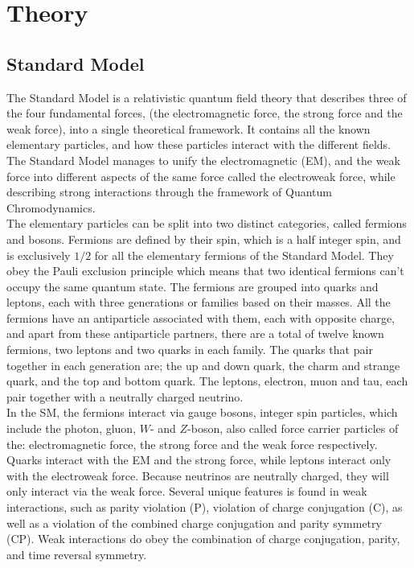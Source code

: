 \documentclass[12pt,a4paper]{article}
\numberwithin{equation}{section}
\begin{document}
\section{Theory}

\subsection{Standard Model}
The Standard Model is a relativistic quantum field theory that describes three
of the four fundamental forces, (the electromagnetic force, the strong force and
the weak force), into a single theoretical framework. It contains all the known
elementary particles, and how these particles interact with the different
fields. The Standard Model manages to unify the electromagnetic (EM), and the
weak force into different aspects of the same force called the electroweak
force, while describing strong interactions through the framework of Quantum
Chromodynamics.\\

The elementary particles can be split into two distinct categories, called
fermions and bosons. Fermions are defined by their spin, which is a half integer
spin, and is exclusively $1/2$ for all the elementary fermions of the Standard
Model. They obey the Pauli exclusion principle which means that two identical
fermions can't occupy the same quantum state. The fermions are grouped into
quarks and leptons, each with three generations or families based on their
masses. All the fermions have an antiparticle associated with them, each with
opposite charge, and apart from these antiparticle partners, there are a total
of twelve known fermions, two leptons and two quarks in each family. The quarks
that pair together in each generation are; the up and down quark, the charm and
strange quark, and the top and bottom quark. The leptons, electron, muon and
tau, each pair together with a neutrally charged neutrino.\\


In the SM, the fermions interact via gauge bosons, integer spin particles, which
include the photon, gluon, $W$- and $Z$-boson, also called force carrier
particles of the: electromagnetic force, the strong force and the weak force
respectively. Quarks interact with the EM and the strong force, while leptons
interact only with the electroweak force. Because neutrinos are neutrally
charged, they will only interact via the weak force. Several unique features is
found in weak interactions, such as parity violation (P), violation of charge
conjugation (C), as well as a violation of the combined charge conjugation and
parity symmetry (CP). Weak interactions do obey the combination of charge
conjugation, parity, and time reversal symmetry.
\end{document}
